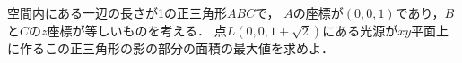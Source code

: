 \documentclass[../../main.tex]{subfiles}
\begin{document}
空間内にある一辺の長さが1の正三角形$ABC$で，
$A$の座標が$(0,0,1)$であり，$B$と$C$の$z$座標が等しいものを考える．
点$L(0,0,1+\sqrt{2})$にある光源が$xy$平面上に作るこの正三角形の影の部分の面積の最大値を求めよ．
\end{document}
